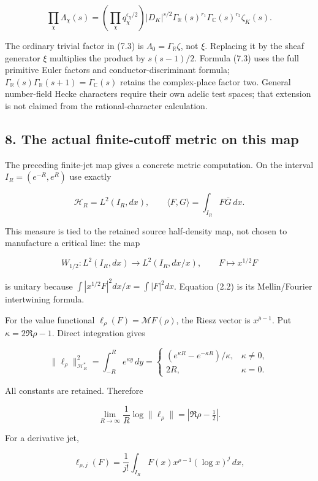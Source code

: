 \documentclass[
]{article}
\begin{document}
\[
\prod_\chi\Lambda_\chi(s)
=\left(\prod_\chi q_\chi^{\epsilon_\chi/2}\right)
|D_K|^{s/2}\Gamma_{\mathbb R}(s)^{r_1}\Gamma_{\mathbb C}(s)^{r_2}\zeta_K(s). \tag{7.3}
\]

The ordinary trivial factor in (7.3) is
\(\Lambda_0=\Gamma_{\mathbb R}\zeta\), not \(\xi\). Replacing it by the
sheaf generator \(\xi\) multiplies the product by \(s(s-1)/2\). Formula
(7.3) uses the full primitive Euler factors and conductor-discriminant
formula;
\(\Gamma_{\mathbb R}(s)\Gamma_{\mathbb R}(s+1)=\Gamma_{\mathbb C}(s)\)
retains the complex-place factor two. General number-field Hecke
characters require their own adelic test spaces; that extension is not
claimed from the rational-character calculation.

\subsection{8. The actual finite-cutoff metric on this
map}\label{the-actual-finite-cutoff-metric-on-this-map}

The preceding finite-jet map gives a concrete metric computation. On the
interval \(I_R=(e^{-R},e^R)\) use exactly

\[
\mathcal H_R=L^2(I_R,dx),\qquad \langle F,G\rangle=\int_{I_R}F\bar G\,dx.
\]

This measure is tied to the retained source half-density map, not chosen
to manufacture a critical line: the map

\[
W_{1/2}:L^2(I_R,dx)\longrightarrow L^2(I_R,dx/x),\qquad F\mapsto x^{1/2}F
\]

is unitary because \(\int|x^{1/2}F|^2dx/x=\int|F|^2dx\). Equation (2.2)
is its Mellin/Fourier intertwining formula.

For the value functional \(\ell_\rho(F)=\mathcal MF(\rho)\), the Riesz
vector is \(x^{\bar\rho-1}\). Put \(\kappa=2\Re\rho-1\). Direct
integration gives

\[
\boxed{
\|\ell_\rho\|_{\mathcal H_R^*}^2
=\int_{-R}^R e^{\kappa y}\,dy
=\begin{cases}
(e^{\kappa R}-e^{-\kappa R})/\kappa,&\kappa\ne0,\\
2R,&\kappa=0.
\end{cases}} \tag{8.1}
\]

All constants are retained. Therefore

\[
\boxed{\lim_{R\to\infty}\frac1R\log\|\ell_\rho\|=|\Re\rho-\tfrac12|.} \tag{8.2}
\]

For a derivative jet,

\[
\ell_{\rho,j}(F)=\frac1{j!}\int_{I_R}F(x)x^{\rho-1}(\log x)^j\,dx,
\]
\end{document}
